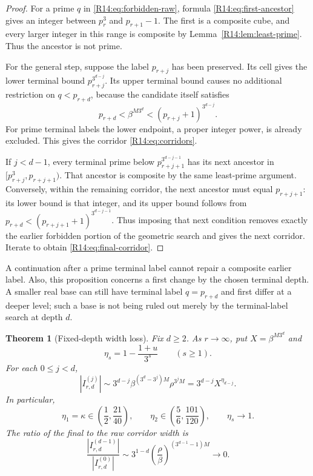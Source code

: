 \documentclass[11pt,a4paper]{article}
\newtheorem{theorem}{Theorem}[section]
\theoremstyle{definition}\newtheorem{definition}[theorem]{Definition}
\theoremstyle{remark}\newtheorem{remark}[theorem]{Remark}
\begin{document}
\begin{proof}
For a prime $q$ in \eqref{R14:eq:forbidden-raw}, formula
\eqref{R14:eq:first-ancestor} gives an integer between $p_r^3$ and
$p_{r+1}-1$. The first is a composite cube, and every larger
integer in this range is composite by
Lemma~\ref{R14:lem:least-prime}. Thus the ancestor is not prime.

For the general step, suppose the label $p_{r+j}$ has been
preserved. Its cell gives the lower terminal bound
$p_{r+j}^{3^{d-j}}$. Its upper terminal bound causes no additional
restriction on $q<p_{r+d}$, because the candidate itself satisfies
\[
 p_{r+d}<\beta^{M3^d}
 <(p_{r+j}+1)^{3^{d-j}}.
\]
For prime terminal labels the lower endpoint, a proper integer
power, is already excluded. This gives the corridor
\eqref{R14:eq:corridors}.

If $j<d-1$, every terminal prime below
$p_{r+j+1}^{3^{d-j-1}}$ has its next ancestor in
$[p_{r+j}^3,p_{r+j+1})$. That ancestor is composite by the same
least-prime argument. Conversely, within the remaining corridor,
the next ancestor must equal $p_{r+j+1}$: its lower bound is that
integer, and its upper bound follows from
$p_{r+d}<(p_{r+j+1}+1)^{3^{d-j-1}}$. Thus imposing that next
condition removes exactly the earlier forbidden portion of the
geometric search and gives the next corridor. Iterate to obtain
\eqref{R14:eq:final-corridor}.
\end{proof}

A continuation after a prime terminal label cannot repair a
composite earlier label. Also, this proposition concerns a first
change by the chosen terminal depth. A smaller real base can still
have terminal label $q=p_{r+d}$ and first differ at a deeper level;
such a base is not being ruled out merely by the terminal-label
search at depth $d$.

\begin{theorem}[Fixed-depth width loss]\label{R14:thm:width}
Fix $d\ge2$. As $r\to\infty$, put $X=\beta^{M3^d}$ and
\[
 \eta_s=1-\frac{1+u}{3^s}\qquad(s\ge1).
\]
For each $0\le j<d$,
\begin{equation}\label{R14:eq:width}
 |I_{r,d}^{(j)}|
 \sim3^{d-j}\beta^{(3^d-3^j)M}\rho^{3^jM}
 =3^{d-j}X^{\eta_{d-j}}.
\end{equation}
In particular,
\begin{equation}\label{R14:eq:eta-ranges}
 \eta_1=\kappa\in\left(\frac12,\frac{21}{40}\right),
 \qquad
 \eta_2\in\left(\frac56,\frac{101}{120}\right),
 \qquad\eta_s\longrightarrow1.
\end{equation}
The ratio of the final to the raw corridor width is
\begin{equation}\label{R14:eq:width-ratio}
 \frac{|I_{r,d}^{(d-1)}|}{|I_{r,d}^{(0)}|}
 \sim3^{1-d}
 \left(\frac\rho\beta\right)^{(3^{d-1}-1)M}
 \longrightarrow0.
\end{equation}
\end{theorem}
\end{document}
